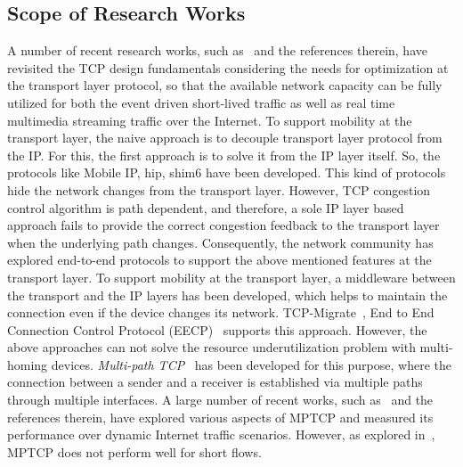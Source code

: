 \subsection{Scope of Research Works}
A number of recent research works, such as~\cite{yadav2016msocket,abdrabou2016experimental,de2016observing,de2016throughput,islam2016start,maity2017tcp,liu2016improving} and the references therein, have revisited the TCP design fundamentals considering the needs for optimization at the transport layer protocol, so that the available network capacity can be fully utilized for both the event driven short-lived traffic as well as real time multimedia streaming traffic over the Internet. To support mobility at the transport layer, the naive approach is to decouple transport layer protocol from the IP. For this, the first approach is to solve it from the IP layer itself. So, the protocols like Mobile IP, \acrfull{hip}, \acrfull{shim6} have been developed. This kind of protocols hide the network changes from the transport layer. However, TCP congestion control algorithm is path dependent, and therefore, a sole IP layer based approach fails to provide the correct congestion feedback to the transport layer when the underlying path changes.  Consequently, the network community has explored end-to-end protocols to support the above mentioned features at the transport layer. To support mobility at the transport layer, a middleware between the transport and the IP layers has been developed, which helps to maintain the connection even if the device changes its network. TCP-Migrate~\cite{Snoeren2000},  End to End Connection Control Protocol (EECP)~\cite{Arye2012} supports this approach.  However, the above approaches can not solve the resource underutilization problem with multi-homing devices. {\em Multi-path TCP}~\cite{scharf2013multipath} has been developed for this purpose, where the connection between a sender and a receiver is established via multiple paths through multiple interfaces. A large number of recent works, such as~\cite{oh2016feedback,barik2016lisa,khalili2013mptcp} and the references therein, have explored various aspects of MPTCP and measured its performance over dynamic Internet traffic scenarios. However, as explored in~\cite{kheirkhah2016mmptcp,kheirkhah2015short}, MPTCP does not perform well for short flows. 

